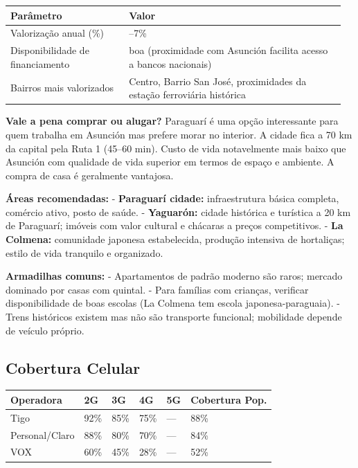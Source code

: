 {\small
\setlength{\tabcolsep}{3pt}
\renewcommand{\arraystretch}{1.12}
\begin{tabularx}{\linewidth}{>{\raggedright\arraybackslash}p{0.34\linewidth} >{\raggedright\arraybackslash}p{0.62\linewidth}}
\toprule
Parâmetro & Valor \\
\midrule
Valorização anual (\%) & 5--7\% \\
Disponibilidade de financiamento & boa (proximidade com Asunción facilita acesso a bancos nacionais) \\
Bairros mais valorizados & Centro, Barrio San José, proximidades da estação ferroviária histórica \\
\bottomrule
\end{tabularx}
}


\textbf{Vale a pena comprar ou alugar?}
Paraguarí é uma opção interessante para quem trabalha em Asunción mas prefere morar no interior. A cidade fica a 70 km da capital pela Ruta 1 (45--60 min). Custo de vida notavelmente mais baixo que Asunción com qualidade de vida superior em termos de espaço e ambiente. A compra de casa é geralmente vantajosa.

\textbf{Áreas recomendadas:}
- \textbf{Paraguarí cidade:} infraestrutura básica completa, comércio ativo, posto de saúde.
- \textbf{Yaguarón:} cidade histórica e turística a 20 km de Paraguarí; imóveis com valor cultural e chácaras a preços competitivos.
- \textbf{La Colmena:} comunidade japonesa estabelecida, produção intensiva de hortaliças; estilo de vida tranquilo e organizado.

\textbf{Armadilhas comuns:}
- Apartamentos de padrão moderno são raros; mercado dominado por casas com quintal.
- Para famílias com crianças, verificar disponibilidade de boas escolas (La Colmena tem escola japonesa-paraguaia).
- Trens históricos existem mas não são transporte funcional; mobilidade depende de veículo próprio.




\subsection{Cobertura Celular}



{\small
\setlength{\tabcolsep}{3pt}
\renewcommand{\arraystretch}{1.12}
{\small
\begin{tabularx}{\linewidth}{lXXXXX}
\toprule
Operadora & 2G & 3G & 4G & 5G & Cobertura Pop. \\
\midrule
Tigo & 92\% & 85\% & 75\% & --- & 88\% \\
Personal/Claro & 88\% & 80\% & 70\% & --- & 84\% \\
VOX & 60\% & 45\% & 28\% & --- & 52\% \\
\bottomrule
\end{tabularx}
}
}

